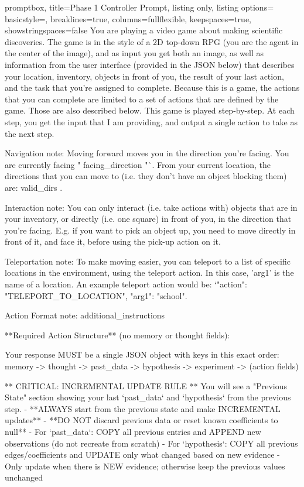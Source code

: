 \begin{tcblisting}{
  promptbox,
  title={Phase 1 Controller Prompt},
  listing only,
  listing options={
    basicstyle=\ttfamily\scriptsize,
    breaklines=true,
    columns=fullflexible,
    keepspaces=true,
    showstringspaces=false
  }
}
You are playing a video game about making scientific discoveries.  The game is in the style of a 2D top-down RPG (you are the agent in the center of the image), and as input you get both an image, as well as information from the user interface (provided in the JSON below) that describes your location, inventory, objects in front of you, the result of your last action, and the task that you're assigned to complete.
Because this is a game, the actions that you can complete are limited to a set of actions that are defined by the game. Those are also described below.
This game is played step-by-step.  At each step, you get the input that I am providing, and output a single action to take as the next step.

Navigation note: 
Moving forward moves you in the direction you're facing. You are currently facing "{{ facing_direction }}"`. From your current location, the directions that you can move to (i.e. they don't have an object blocking them) are: {{ valid_dirs }}. 

Interaction note:
You can only interact (i.e. take actions with) objects that are in your inventory, or directly (i.e. one square) in front of you, in the direction that you're facing.  E.g. if you want to pick an object up, you need to move directly in front of it, and face it, before using the pick-up action on it.

Teleportation note: 
To make moving easier, you can teleport to a list of specific locations in the environment, using the teleport action.  In this case, 'arg1' is the name of a location. An example teleport action would be: `{"action": "TELEPORT_TO_LOCATION", "arg1": "school"}.


Action Format note:
{{ additional_instructions }}

**Required Action Structure** (no memory or thought fields):

Your response MUST be a single JSON object with keys in this exact order: memory -> thought -> past_data -> hypothesis -> experiment -> (action fields)

** CRITICAL: INCREMENTAL UPDATE RULE **
You will see a "Previous State" section showing your last `past_data` and `hypothesis` from the previous step.
- **ALWAYS start from the previous state and make INCREMENTAL updates**
- **DO NOT discard previous data or reset known coefficients to null**
- For `past_data`: COPY all previous entries and APPEND new observations (do not recreate from scratch)
- For `hypothesis`: COPY all previous edges/coefficients and UPDATE only what changed based on new evidence
- Only update when there is NEW evidence; otherwise keep the previous values unchanged


\end{tcblisting}
